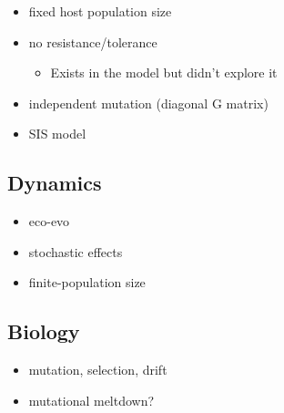 \begin{itemize}
    \item fixed host population size
    \item no resistance/tolerance
      \begin{itemize}
      \item Exists in the model but didn't explore it
      \end{itemize}
    \item independent mutation (diagonal G matrix)
    \item SIS model
\end{itemize}

\subsection*{Dynamics}

\begin{itemize}
    \item eco-evo
    \item stochastic effects
    \item finite-population size
\end{itemize}

\subsection*{Biology}

\begin{itemize}
    \item mutation, selection, drift
    \item mutational meltdown?
\end{itemize}
